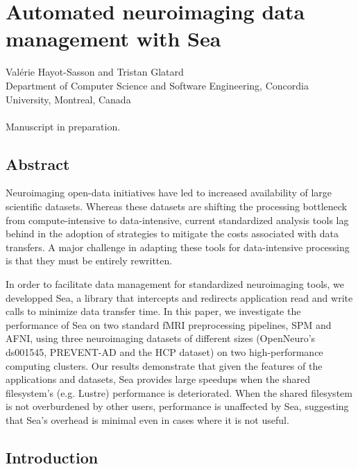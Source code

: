 \chapter{Automated neuroimaging data management with Sea}\label{chapter:sea-neuro}

Val\'erie Hayot-Sasson and Tristan Glatard \\
\begingroup \footnotesize
Department of Computer Science and Software Engineering, Concordia University, Montreal, Canada \\
\endgroup 
\vspace{5pt} \\
Manuscript in preparation. \\

\section{Abstract}

	Neuroimaging open-data initiatives have led to increased availability of large scientific datasets. 
  Whereas these datasets are shifting the processing bottleneck from compute-intensive to data-intensive,
  current standardized analysis tools lag behind in the adoption of strategies to mitigate the costs associated with
  data transfers. A major challenge in adapting these tools for data-intensive processing is that they must be entirely
  rewritten.
  
  In order to facilitate data management for standardized neuroimaging tools, we developped Sea, a library that intercepts
  and redirects application read and write calls to minimize data transfer time. In this paper, we investigate
  the performance of Sea on two standard fMRI preprocessing pipelines, SPM and AFNI, using three neuroimaging datasets of different sizes
  (OpenNeuro's ds001545, PREVENT-AD and the HCP dataset) on two high-performance computing clusters. Our results demonstrate that given the features of the applications and datasets,
  Sea provides large speedups when the shared filesystem's (e.g. Lustre) performance is deteriorated. When the shared filesystem is not overburdened by other users,
  performance is unaffected by Sea, suggesting that Sea's overhead is minimal even in cases where it is not useful.
  
  \section{Introduction}\label{sec:sea_neuro:introduction}
    
